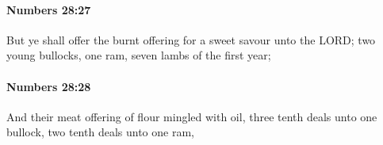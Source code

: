 		\paragraph{Numbers 28:27} %
			\label{NUMBERS-28-27}

			But ye shall offer the burnt offering for a sweet savour unto the LORD; two young bullocks, one ram, seven lambs of the first year;


		\paragraph{Numbers 28:28} %
			\label{NUMBERS-28-28}

			And their meat offering of flour mingled with oil, three tenth deals unto one bullock, two tenth deals unto one ram,


